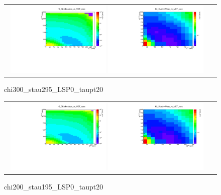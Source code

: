 \begin{figure}[tbh!]
	\centering
	\begin{tabular}{cc}
		\includegraphics[width=0.48\textwidth]{analysis/pics/chi300_stau295_LSP0_taupt20.pdf}
		\includegraphics[width=0.48\textwidth]{analysis/pics/chi300_stau295_LSP0_taupt20_zoom.pdf} 		
	\end{tabular}
	\caption{chi300\_stau295\_LSP0\_taupt20}
\end{figure}

\begin{figure}[tbh!]
	\centering
	\begin{tabular}{cc}
		\includegraphics[width=0.48\textwidth]{analysis/pics/chi200_stau195_LSP0_taupt20.pdf}
		\includegraphics[width=0.48\textwidth]{analysis/pics/chi200_stau195_LSP0_taupt20_zoom.pdf} 		
	\end{tabular}
	\caption{chi200\_stau195\_LSP0\_taupt20}
\end{figure}

